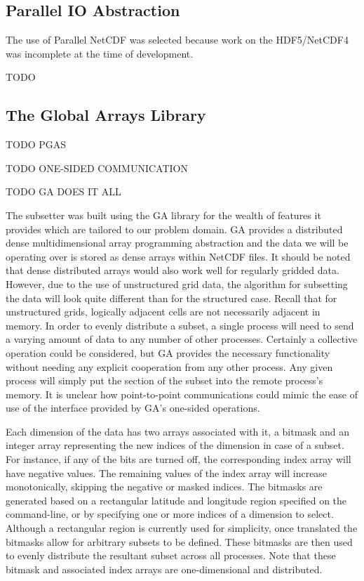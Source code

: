 \subsection{Parallel IO Abstraction}

The use of Parallel NetCDF was selected because work on the HDF5/NetCDF4 was
incomplete at the time of development.

TODO

\subsection{The Global Arrays Library}

TODO PGAS

TODO ONE-SIDED COMMUNICATION

TODO GA DOES IT ALL

The subsetter was built using the GA library for the wealth of features it
provides which are tailored to our problem domain.  GA provides a distributed
dense multidimensional array programming abstraction and the data we will be
operating over is stored as dense arrays within NetCDF files.  It should be
noted that dense distributed arrays would also work well for regularly gridded
data.  However, due to the use of unstructured grid data, the algorithm for
subsetting the data will look quite different than for the structured case.
Recall that for unstructured grids, logically adjacent cells are not
necessarily adjacent in memory.  In order to evenly distribute a subset, a
single process will need to send a varying amount of data to any number of
other processes.  Certainly a collective operation could be considered, but GA
provides the necessary functionality without needing any explicit cooperation
from any other process.  Any given process will simply put the section of the
subset into the remote process's memory.  It is unclear how point-to-point
communications could mimic the ease of use of the interface provided by GA's
one-sided operations.

Each dimension of the data has two arrays associated with it, a bitmask and an
integer array representing the new indices of the dimension in case of a
subset.  For instance, if any of the bits are turned off, the corresponding
index array will have negative values.  The remaining values of the index
array will increase monotonically, skipping the negative or masked indices.
The bitmasks are generated based on a rectangular latitude and longitude
region specified on the command-line, or by specifying one or more indices of
a dimension to select.  Although a rectangular region is currently used for
simplicity, once translated the bitmasks allow for arbitrary subsets to be
defined.  These bitmasks are then used to evenly distribute the resultant
subset across all processes.  Note that these bitmask and associated index
arrays are one-dimensional and distributed.

